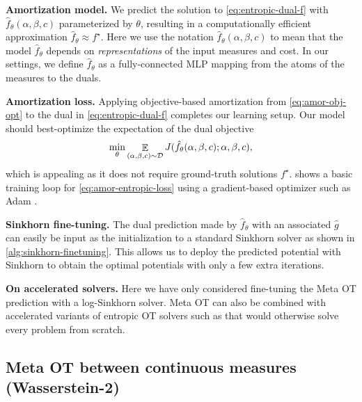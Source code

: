 \documentclass{article}
\begin{document}
\textbf{Amortization model.}
We predict the solution to \cref{eq:entropic-dual-f} with
$\hat f_\theta(\alpha, \beta, c)$ parameterized by $\theta$, resulting in
a computationally efficient approximation $\hat f_\theta \approx f^\star$.
Here we use the notation $\hat f_\theta(\alpha,\beta,c)$ to mean that
the model $\hat f_\theta$ depends on \emph{representations} of
the input measures and cost.
In our settings, we define $\hat f_\theta$ as a fully-connected MLP
mapping from the atoms of the measures to the duals.

\textbf{Amortization loss.}
Applying objective-based amortization from \cref{eq:amor-obj-opt} to
the dual in \cref{eq:entropic-dual-f} completes our
learning setup. Our model should best-optimize the expectation of the dual objective
\begin{equation}
  \min_\theta \mathop{\mathbb{E}}_{(\alpha,\beta,c)\sim{\mathcal{D}}} J(\hat f_\theta(\alpha, \beta, c); \alpha, \beta, c),
  \label{eq:amor-entropic-loss}
\end{equation}
which is appealing as it does not require ground-truth solutions $f^\star$.
 shows a basic training loop for
\cref{eq:amor-entropic-loss} using a gradient-based
optimizer such as Adam \citep{kingma2014adam}.

\textbf{Sinkhorn fine-tuning.}
The dual prediction made by $\hat f_\theta$ with an associated $\hat g$
can easily be input as the initialization to a standard Sinkhorn solver
as shown in \cref{alg:sinkhorn-finetuning}.
This allows us to deploy the predicted potential with
Sinkhorn to obtain the optimal potentials with
only a few extra iterations.

\textbf{On accelerated solvers.}
Here we have only considered fine-tuning the Meta OT prediction
with a log-Sinkhorn solver.
Meta OT can also be combined with accelerated variants of
entropic OT solvers such as
\citet{thibault2017overrelaxed,altschuler2017near,alaya2019screening,lin2019acceleration}
that would otherwise solve every problem from scratch.


\subsection{Meta OT between continuous measures (Wasserstein-2)}
\label{sec:meta-ot:icnn}
\begin{figure}[t]

\end{figure}
\end{document}
